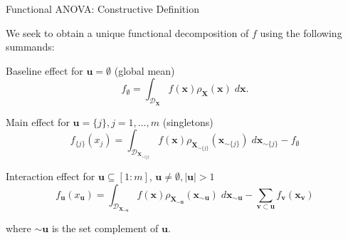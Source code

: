 \documentclass[english,aspectratio=169]{beamer}
\let\tempone\itemize
\let\temptwo\enditemize
\renewenvironment{itemize}{\tempone\addtolength{\itemsep}{0.35\baselineskip}}{\temptwo}
\renewcommand{\emph}[1]{\textcolor[HTML]{006d2c}{\fontseries{sb}\selectfont #1}}
\begin{document}
\begin{frame}[fragile]{Functional ANOVA: Constructive Definition}
\small

We seek to obtain a unique functional decomposition of $f$ using the following \emph{summands}:
\vspace{1.0em}
\begin{itemize}
  \item<1-> \emph{Baseline effect} for $\bm{u} = \emptyset$ (global mean)
  \begin{equation*}
    f_\emptyset = \int_{\mathcal{D}_{\bm{X}}} f(\bm{x}) \rho_{\bm{X}} (\bm{x}) \; d\bm{x}.  
  \end{equation*}
  
  \item<2-> \emph{Main effect} for $\bm{u} = \{ j \}, j = 1, \ldots, m$ (singletons)
  \begin{equation*}
    f_{\{ j \}} (x_j) = \int_{\mathcal{D}_{\bm{X}_{\sim{\{ j \}}}}} f (\bm{x}) \rho_{\bm{X}_{\sim \{j\}}} (\bm{x}_{\sim \{j\}}) \; d\bm{x}_{\sim \{j\}} - f_\emptyset
  \end{equation*}

  \item<3-> \emph{Interaction effect} for $\bm{u} \subseteq [1:m]$, $\bm{u} \neq \emptyset, \lvert \bm{u} \rvert > 1$
  \begin{equation*}
    f_{\bm{u}} (x_{\bm{u}}) = \int_{\mathcal{D}_{\bm{X}_{\sim \bm{u}}}} f (\bm{x}) \rho_{\bm{X}_{\sim \bm{u}}} (\bm{x}_{\sim \bm{u}}) \; d\bm{x}_{\sim \bm{u}} - \sum_{\bm{v} \subset \bm{u}} f_{\bm{v}} (\bm{x}_{\bm{v}})
  \end{equation*}
\end{itemize}

where $\sim \bm{u}$ is the set complement of $\bm{u}$.

\end{frame}
\end{document}
